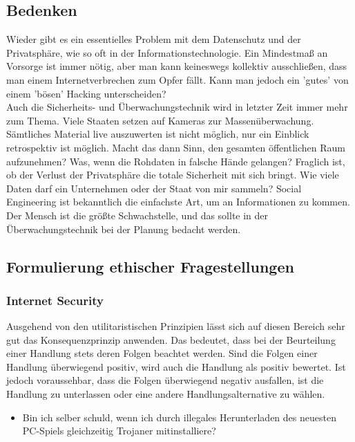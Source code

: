 \documentclass[letterpaper, 12pt]{article}
\let\tempsubsection\subsection
\renewcommand\subsection[1]{\vspace{0cm}\tempsubsection{#1}\vspace{0cm}}
\let\tempsubsubsection\subsubsection
\renewcommand\subsubsection[1]{\vspace{0cm}\tempsubsubsection{#1}\vspace{0cm}}
\begin{document}
\subsection{Bedenken}

Wieder gibt es ein essentielles Problem mit dem Datenschutz und der Privatsphäre, wie so oft in der Informationstechnologie. Ein Mindestmaß an Vorsorge ist immer nötig, aber man kann keineswegs kollektiv ausschließen, dass man einem Internetverbrechen zum Opfer fällt. Kann man jedoch ein 'gutes' von einem 'bösen' Hacking unterscheiden? \\
Auch die Sicherheits- und Überwachungstechnik wird in letzter Zeit immer mehr zum Thema. Viele Staaten setzen auf Kameras zur Massenüberwachung. Sämtliches Material live auszuwerten ist nicht möglich, nur ein Einblick retrospektiv ist möglich. Macht das dann Sinn, den gesamten öffentlichen Raum aufzunehmen? Was, wenn die Rohdaten in falsche Hände gelangen? Fraglich ist, ob der Verlust der Privatsphäre die totale Sicherheit mit sich bringt. Wie viele Daten darf ein Unternehmen oder der Staat von mir sammeln? Social Engineering ist bekanntlich die einfachste Art, um an Informationen zu kommen. Der Mensch ist die größte Schwachstelle, und das sollte in der Überwachungstechnik bei der Planung bedacht werden.

\subsection{Formulierung ethischer Fragestellungen}

\subsubsection{Internet Security}

Ausgehend von den utilitaristischen Prinzipien lässt sich auf diesen Bereich sehr gut das
Konsequenzprinzip anwenden. Das bedeutet, dass bei der Beurteilung einer Handlung stets deren
Folgen beachtet werden. Sind die Folgen einer Handlung überwiegend positiv, wird auch die
Handlung als positiv bewertet. Ist jedoch voraussehbar, dass die Folgen überwiegend negativ
ausfallen, ist die Handlung zu unterlassen oder eine andere Handlungsalternative zu wählen.

\begin{itemize}
	\item Bin ich selber schuld, wenn ich durch illegales Herunterladen des neuesten PC-Spiels
gleichzeitig Trojaner mitinstalliere?
\end{itemize}
\end{document}
